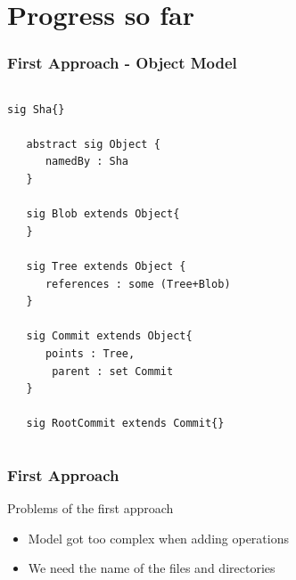 \documentclass{beamer}
\begin{document}
\section{Progress so far}


\begin{frame}[fragile]
   \frametitle{First Approach - Object Model}
   \tiny
   \begin{columns}[c]
      \column{1.5in}
   \begin{lstlisting}[escapechar=!]
   sig Sha{}

   abstract sig Object {
      namedBy : Sha
   }

   sig Blob extends Object{
   }

   sig Tree extends Object {
      references : some (Tree+Blob)
   }

   sig Commit extends Object{
      points : Tree,
  	   parent : set Commit
   }

   sig RootCommit extends Commit{}
   \end{lstlisting}
      \column{1.5in}
   \end{columns}
\end{frame}

\begin{frame}[fragile]
   \frametitle{First Approach}
   \begin{block}{Problems of the first approach}
      \begin{itemize}
         \item Model got too complex when adding operations
         \item We need the name of the files and directories
      \end{itemize}
   \end{block}
\end{frame}
\end{document}
